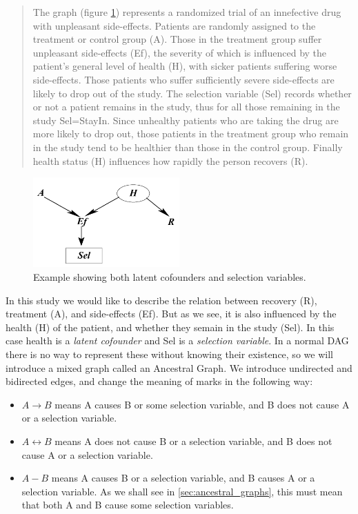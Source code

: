 \documentclass[11pt,a4paper]{report}
\theoremstyle{definition}
\begin{document}
\begin{quote}
  The graph (figure \ref{fig:example}) represents a randomized trial of an
  innefective drug with unpleasant side-effects. Patients are randomly
  assigned to the treatment or control group (A). Those in the treatment
  group suffer unpleasant side-effects (Ef), the severity of which is
  influenced by the patient's general level of health (H), with sicker
  patients suffering worse side-effects. Those patients who suffer
  sufficiently severe side-effects are likely to drop out of the study.
  The selection variable (Sel) records whether or not a patient remains in
  the study, thus for all those remaining in the study Sel=StayIn. Since
  unhealthy patients who are taking the drug are more likely to drop out,
  those patients in the treatment group who remain in the study tend to be
  healthier than those in the control group. Finally health status (H)
  influences how rapidly the person recovers (R).
\end{quote}

\begin{figure}
  \centering
  \includegraphics[width=0.5\textwidth]{imgs/example1.png}
  \caption{Example showing both latent cofounders and selection variables.}
  \label{fig:example}
\end{figure}

In this study we would like to describe the relation between recovery (R),
treatment (A), and side-effects (Ef). But as we see, it is also influenced
by the health (H) of the patient, and whether they semain in the study
(Sel). In this case health is a \emph{latent cofounder} and Sel is a
\emph{selection variable}. In a normal DAG there is no way to represent
these without knowing their existence, so we will introduce a mixed graph
called an Ancestral Graph. We introduce undirected and bidirected edges,
and change the meaning of marks in the following way:

\begin{itemize}
  \item $A \rightarrow B$ means A causes B or some selection variable, and B
    does not cause A or a selection variable.

  \item $A \leftrightarrow B$ means A does not cause B or a selection
    variable, and B does not cause A or a selection variable.

  \item $A - B$ means A causes B or a selection variable, and B causes A
    or a selection variable. As we shall see in
    \ref{sec:ancestral_graphs}, this must mean that both A and B cause
    some selection variables.
\end{itemize}
\end{document}
